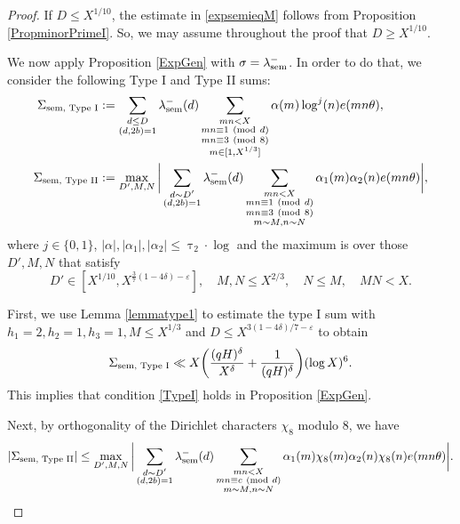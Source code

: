 \documentclass[12pt]{amsart}
\numberwithin{equation}{section}
\theoremstyle{remark}
\theoremstyle{definition}
\newcommand{\imod}[1]{\ (\mathrm{mod}\ #1)}
\begin{document}
\begin{proof}
If $D\leq X^{1/10}$, the estimate in \eqref{expsemieqM} follows from Proposition \ref{PropminorPrimeI}. So, we may assume throughout the proof that $D\geq X^{1/10}$.

We now apply Proposition \ref{ExpGen} with ${\sigma}=\lambda_{\textup{sem}}^-$. In order to do that, we consider the following Type I and Type II sums:
\begin{align}
\notag \Sigma_{\textup{sem, Type I}}&:= \sum_{\substack{d\leq D\\(d, 2b)=1}}\lambda_{\textup{sem}}^-(d)\sum_{\substack{mn<X\\mn \equiv 1 \imod d\\mn\equiv 3\imod 8\\m\in [1, X^{1/3}]}}{\alpha}(m)\log^j(n)e(mn\theta),\\
\notag \Sigma_{\textup{sem, Type II}}&:= \max_{D', M, N}\bigg|\sum_{\substack{d\sim D'\\(d, 2b)=1}}\lambda_{\textup{sem}}^-(d)\sum_{\substack{mn<X\\mn \equiv 1 \imod d\\mn\equiv 3\imod 8\\m \sim M, n\sim N}}{\alpha}_1(m){\alpha}_2(n)e(mn\theta)\bigg|,
\end{align}
where $j\in \{0, 1\}$, $|{\alpha}|, |{\alpha}_1|, |{\alpha}_2|\leq \uptau_2\cdot \log$ and the maximum is over those $D', M, N$ that satisfy
\begin{equation}\label{semieq0}
D' \in [X^{1/10}, X^{\frac{3}{7}(1-4\delta)-\varepsilon}], \quad M, N\leq X^{2/3}, \quad N\leq M, \quad MN<X.
\end{equation}

First, we use Lemma \ref{lemmatype1} to estimate the type I sum with $h_1=2, h_2=1, h_3=1, M\leq X^{1/3}$ and $D\leq X^{3(1-4\delta)/7-\varepsilon}$ to obtain
\begin{align}
\notag \Sigma_{\textup{sem, Type I}} \ll X\bigg(\dfrac{(qH)^{\delta}}{X^{\delta}} + \dfrac{1}{(qH)^\delta}\bigg)(\log X)^6.
\end{align}
This implies that condition \ref{TypeI} holds in Proposition \ref{ExpGen}.

Next, by orthogonality of the Dirichlet characters $\chi_8$ modulo $8$, we have
\begin{align}
\notag |\Sigma_{\textup{sem, Type II}}|\leq \max_{D', M, N}\bigg|\sum_{\substack{d\sim D'\\(d, 2b)=1}}\lambda_{\textup{sem}}^-(d)\sum_{\substack{mn<X\\mn \equiv c \imod d\\m\sim M, n\sim N}}{\alpha}_1(m)\chi_8(m){\alpha}_2(n)\chi_8(n)e(mn\theta)\bigg|.
\end{align}



\end{proof}
\end{document}

